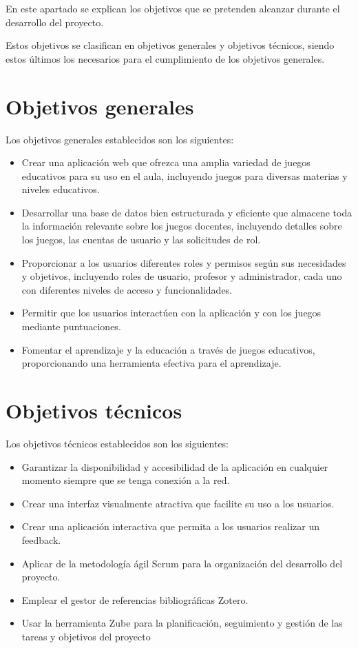 
En este apartado se explican los objetivos que se pretenden alcanzar durante el desarrollo del proyecto.

Estos objetivos se clasifican en objetivos generales y objetivos técnicos, siendo estos últimos los necesarios para el cumplimiento de los objetivos generales.

\section {Objetivos generales}
Los objetivos generales establecidos son los siguientes:
\begin{itemize}
    \item Crear una aplicación web que ofrezca una amplia variedad de juegos educativos para su uso en el aula, incluyendo juegos para diversas materias y niveles educativos.
    \item Desarrollar una base de datos bien estructurada y eficiente que almacene toda la información relevante sobre los juegos docentes, incluyendo detalles sobre los juegos, las cuentas de usuario y las solicitudes de rol.
    \item Proporcionar a los usuarios diferentes roles y permisos según sus necesidades y objetivos, incluyendo roles de usuario, profesor y administrador, cada uno con diferentes niveles de acceso y funcionalidades.
    \item Permitir que los usuarios interactúen con la aplicación y con los juegos mediante puntuaciones.
    \item Fomentar el aprendizaje y la educación a través de juegos educativos, proporcionando una herramienta efectiva para el aprendizaje.
\end{itemize}

\section {Objetivos técnicos}
Los objetivos técnicos establecidos son los siguientes:
\begin{itemize}
    \item Garantizar la disponibilidad y accesibilidad de la aplicación en cualquier momento siempre que se tenga conexión a la red.
    \item Crear una interfaz visualmente atractiva que facilite su uso a los usuarios.
    \item Crear una aplicación interactiva que permita a los usuarios realizar un feedback.
    \item Aplicar de la metodología ágil Scrum para la organización del desarrollo del proyecto.
    \item Emplear el gestor de referencias bibliográficas Zotero.
    \item Usar la herramienta Zube para la planificación, seguimiento y gestión de las tareas y objetivos del proyecto
\end{itemize}
	
